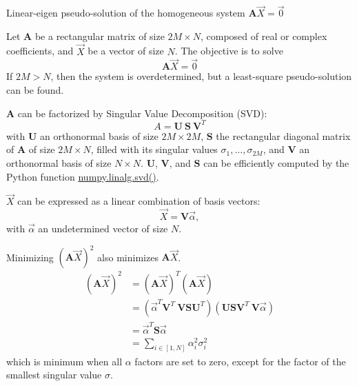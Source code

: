 \newpage
\begin{algorithm}[!ht]
  \caption{Linear-eigen pseudo-solution of the homogeneous system \(\textbf{A} \overrightarrow{X} = \overrightarrow{0}\)}\label{alg:svd}
  \begin{algorithmic}[1]
      \STATEx Let $\textbf{A}$ be a rectangular matrix of size $2M \times N$, composed of real or complex coefficients, and $\overrightarrow{X}$ be a vector of size $N$. The objective is to solve 
      \begin{equation}
        \textbf{A} \overrightarrow{X} = \overrightarrow{0}
      \end{equation}
      \STATEx If $2M>N$, then the system is overdetermined, but a least-square pseudo-solution can be found.
      
      \STATE \textbf{A} can be factorized by Singular Value Decomposition (SVD):
      \begin{equation}
        A = \textbf{U} \ \textbf{S} \ \textbf{V}^T
      \end{equation}
      with $\textbf{U}$ an orthonormal basis of size $2M \times 2M$, \(\textbf{S}\) the rectangular diagonal matrix of \textbf{A} of size $2M \times N$, filled with its singular values \(\sigma_1, \dots, \sigma_{2M}\), and $\textbf{V}$ an orthonormal basis of size $N \times N$. $\textbf{U}$, $\textbf{V}$, and $\textbf{S}$ can be efficiently computed by the Python function \href{https://numpy.org/doc/stable/reference/generated/numpy.linalg.svd.html}{numpy.linalg.svd()}.
      
      \STATE \(\overrightarrow{X}\) can be expressed as a linear combination of basis vectors: 
      \begin{equation}\label{eq:xva}
        \overrightarrow{X} = \textbf{V} \overrightarrow{\alpha},
      \end{equation}
      with \(\overrightarrow{\alpha}\) an undetermined vector of size $N$.  
      
      \STATE Minimizing \((\textbf{A}\overrightarrow{X})^2\) also minimizes \(\textbf{A}\overrightarrow{X}\).
      \begin{equation}
          \begin{aligned}
          (\textbf{A}\overrightarrow{X})^2 & = (\textbf{A} \overrightarrow{X})^T (\textbf{A} \overrightarrow{X})\\
          & = (\overrightarrow{\alpha}^T \textbf{V}^T \ \textbf{V} \textbf{S} \textbf{U}^T)(\textbf{U} \textbf{S} \textbf{V}^T \ \textbf{V}\overrightarrow{\alpha})\\
          & = \overrightarrow{\alpha}^T \textbf{S} \overrightarrow{\alpha}\\
          & = \sum_{i \in [1,N]} \alpha_i^2 \sigma_i^2
          \end{aligned}
      \end{equation}
      which is minimum when all \(\alpha\) factors are set to zero, except for the factor of the smallest singular value \(\sigma\). 


\end{algorithmic}
\end{algorithm}
